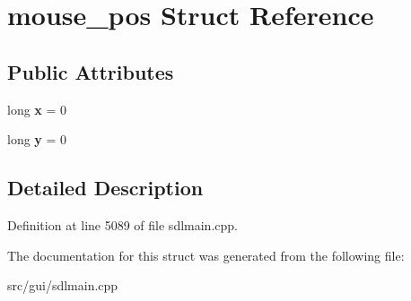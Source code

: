 \hypertarget{structmouse__pos}{\section{mouse\-\_\-pos Struct Reference}
\label{structmouse__pos}
}
\subsection*{Public Attributes}
\begin{DoxyCompactItemize}
\item 
\hypertarget{structmouse__pos_a87e6dd58ae6e8c7d1aabb6892b9d6f01}{long {\bfseries x} = 0}\label{structmouse__pos_a87e6dd58ae6e8c7d1aabb6892b9d6f01}

\item 
\hypertarget{structmouse__pos_a5c8305dffdd8ece94010679489de824d}{long {\bfseries y} = 0}\label{structmouse__pos_a5c8305dffdd8ece94010679489de824d}

\end{DoxyCompactItemize}


\subsection{Detailed Description}


Definition at line 5089 of file sdlmain.\-cpp.



The documentation for this struct was generated from the following file\-:\begin{DoxyCompactItemize}
\item 
src/gui/sdlmain.\-cpp\end{DoxyCompactItemize}
